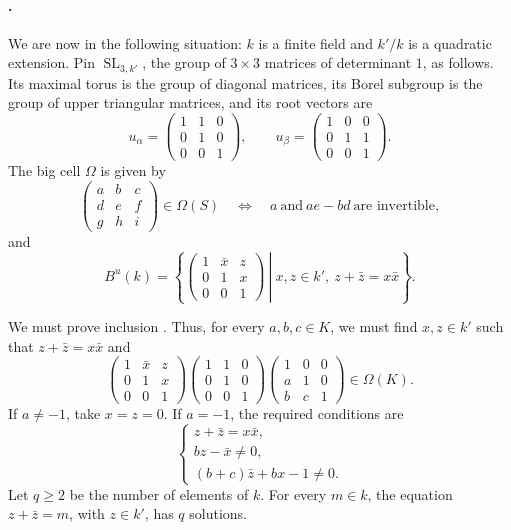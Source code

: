 \paragraph{.}
We are now in the following situation: \(k\) is a finite field and
\(k'/k\) is a quadratic extension.  Pin
\(\operatorname{SL}_{3,k'}\), the group of \(3\times3\) matrices of
determinant \(1\), as follows.  Its maximal torus is the group of
diagonal matrices, its Borel subgroup is the group of upper triangular
matrices, and its root vectors are
\[
 u_\alpha=
 \begin{pmatrix}1&1&0\\0&1&0\\0&0&1\end{pmatrix},
 \qquad
 u_\beta=
 \begin{pmatrix}1&0&0\\0&1&1\\0&0&1\end{pmatrix}.
\]
The big cell \(\Omega\) is given by
\[
 \begin{pmatrix}a&b&c\\d&e&f\\g&h&i\end{pmatrix}
 \in\Omega(S)
 \quad\Longleftrightarrow\quad
 a\ \text{and}\ ae-bd\ \text{are invertible},
\]
and
\[
 B^u(k)=
 \left\{
 \left.
 \begin{pmatrix}1&\bar x&z\\0&1&x\\0&0&1\end{pmatrix}
 \ \right|\
 x,z\in k',\ z+\bar z=x\bar x
 \right\}.
\]

We must prove inclusion \textup{}.  Thus, for every
\(a,b,c\in K\), we must find \(x,z\in k'\) such that
\(z+\bar z=x\bar x\) and
\[
 \begin{pmatrix}1&\bar x&z\\0&1&x\\0&0&1\end{pmatrix}
 \begin{pmatrix}1&1&0\\0&1&0\\0&0&1\end{pmatrix}
 \begin{pmatrix}1&0&0\\a&1&0\\b&c&1\end{pmatrix}
 \in\Omega(K).                                         \tag{3}\label{sga3:xxvi:theorem:5-1:equation:3}
\]
If \(a\ne-1\), take \(x=z=0\).  If \(a=-1\), the required conditions
are
\[
 \begin{cases}
 z+\bar z=x\bar x,\\
 bz-\bar x\ne0,\\
 (b+c)\bar z+bx-1\ne0.
 \end{cases}                                           \tag{4}\label{sga3:xxvi:theorem:5-1:equation:4}
\]
Let \(q\geq2\) be the number of elements of \(k\).  For every
\(m\in k\), the equation \(z+\bar z=m\), with \(z\in k'\), has
\(q\) solutions.


